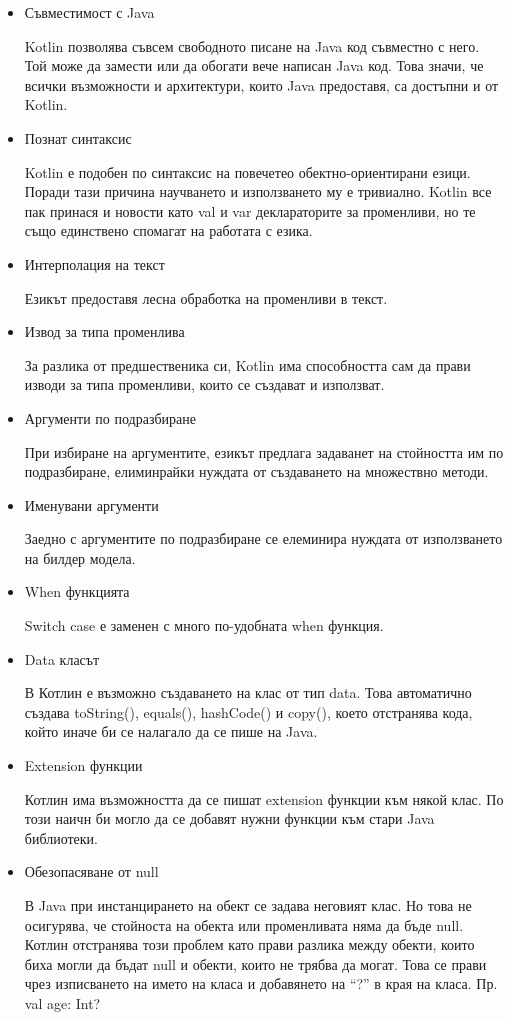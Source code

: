     \begin{itemize}
        \item Съвместимост с Java
        
        
            Kotlin позволява съвсем свободното писане на Java код съвместно с него. Той може да замести или да обогати вече написан Java код. Това значи, че всички възможности и архитектури, които Java предоставя, са достъпни и от Kotlin.
        \item Познат синтаксис
        
        
            Kotlin е подобен по синтаксис на повечетео обектно-ориентирани езици. Поради тази причина научването и използването му е тривиално. Kotlin все пак принася и новости като val и var деклараторите за променливи, но те също единствено спомагат на работата с езика.
        \item Интерполация на текст
        
        
            Езикът предоставя лесна обработка на променливи в текст.
        \item Извод за типа променлива
        
        
            За разлика от предшественика си, Kotlin има способността сам да прави изводи за типа променливи, които се създават и използват.
        \item Аргументи по подразбиране
        
            При избиране на аргументите, езикът предлага задаванет на стойността им по подразбиране, елиминрайки нуждата от създаването на множествно методи.
        \item Именувани аргументи
        
        
            Заедно с аргументите по подразбиране се елеминира нуждата от използването на билдер модела.
        \item When функцията
        
        
            Switch case е заменен с много по-удобната when функция.
        \item Data класът
        
        
            В Котлин е възможно създаването на клас от тип data. Това автоматично създава toString(), equals(), hashCode() и copy(), което отстранява кода, който иначе би се налагало да се пише на Java.
        \item Extension функции
        
        
            Котлин има възможността да се пишат extension функции към някой клас. По този наичн би могло да се добавят нужни функции към стари Java библиотеки.
        \item Обезопасяване от null
        
        
            В Java при инстанцирането на обект се задава неговият клас. Но това не осигурява, че стойноста на обекта или променливата няма да бъде null. Котлин отстранява този проблем като прави разлика между обекти, които биха могли да бъдат null и обекти, които не трябва да могат. Това се прави чрез изписването на името на класа и добавянето на ``?'' в края на класа.
            Пр. val age: Int?
    \end{itemize}
    

